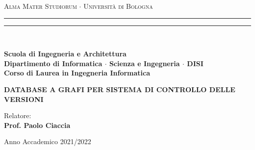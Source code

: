\textwidth=450pt\oddsidemargin=0pt

% 
\begin{titlepage}

    \begin{center}
        {{\Large{\textsc{Alma Mater Studiorum $\cdot$ Universit\`a di Bologna}}}}
        \rule[0.1cm]{15.8cm}{0.1mm}
        \rule[0.5cm]{15.8cm}{0.6mm}
        \\\vspace{3mm}

        {\small{\bf Scuola di Ingegneria e Architettura \\
                Dipartimento di Informatica $\cdot$ Scienza e Ingegneria $\cdot$ DISI\\
                Corso di Laurea in Ingegneria Informatica}}


    \end{center}

    \vspace{23mm}

    \begin{center}{
            \large \bf DATABASE A GRAFI PER SISTEMA DI CONTROLLO DELLE VERSIONI\par
        }\end{center}

    \vspace{40mm} \par \noindent

    \begin{minipage}[t]{0.47\textwidth}{
        \large{
        Relatore:
        \vspace{2mm}\\{
        \bf Prof. Paolo Ciaccia
        }
        }
        }
    \end{minipage}
    \hfill
    \begin{minipage}[t]{0.47\textwidth}
    \end{minipage}

    \vspace{40mm}

    \begin{center}
        Anno Accademico 2021/2022
    \end{center}

\end{titlepage}
% 
